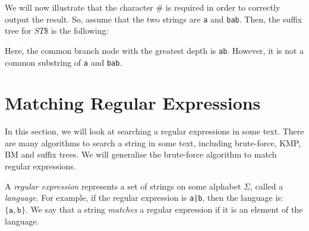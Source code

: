 \documentclass[a4paper, openany]{memoir}
\begin{document}
    We will now illustrate that the character $\#$ is required in order to correctly output the result. So, assume that the two strings are \texttt{a} and \texttt{bab}. Then, the suffix tree for $ST\$$ is the following:
    \begin{figure}[H]
        \centering
    \end{figure}
    \noindent Here, the common branch node with the greatest depth is \texttt{ab}. However, it is not a common substring of \texttt{a} and \texttt{bab}.
    \newpage

    \section{Matching Regular Expressions}
    In this section, we will look at searching a regular expressions in some text. There are many algorithms to search a string in some text, including brute-force, KMP, BM and suffix trees. We will generalise the brute-force algorithm to match regular expressions.

    A \emph{regular expression} represents a set of strings on some alphabet $\Sigma$, called a \emph{language}. For example, if the regular expression is \texttt{a|b}, then the language is: $\{\texttt{a}, \texttt{b}\}$. We say that a string \emph{matches} a regular expression if it is an element of the language.
\end{document}
